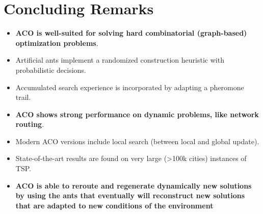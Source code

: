 \section{Concluding Remarks}
\begin{itemize}
    \item \textbf{ACO is well-suited for solving hard combinatorial (graph-based) optimization problems}.
    \item Artificial ants implement a randomized construction heuristic with probabilistic decisions.
    \item Accumulated search experience is incorporated by adapting a pheromone trail.
    \item \textbf{ACO shows strong performance on dynamic problems, like network routing}.
    \item Modern ACO versions include local search (between local and global update).
    \item State-of-the-art results are found on very large (>100k cities) instances of TSP.
    \item \textbf{ACO is able to reroute and regenerate dynamically new solutions by using the ants that eventually will reconstruct new solutions that are adapted to new conditions of the environment}
\end{itemize}
